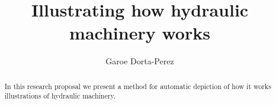 \documentclass[11pt]{report}
\title{ Illustrating how hydraulic machinery works } \author{Garoe Dorta-Perez}
\begin{document}
\maketitle
\begin{abstract}
In this research proposal we present a method for automatic depiction of how it works illustrations of hydraulic machinery. \end{abstract}















\end{document}
